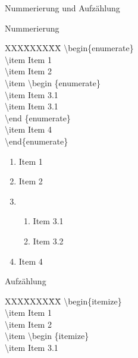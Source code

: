\begin{frame}[fragile]{Nummerierung und Aufz\"ahlung}
\begin{multicols}{2}
Nummerierung
\scriptsize
\begin{tabbing}
XXX\=XXXX\=XX\=\kill
\color{cturkis}\textbackslash begin\{\color{cpurple}enumerate\color{black}\}\\
\>\color{cred}\textbackslash item \color{black}Item 1\\
\>\color{cred}\textbackslash item \color{black}Item 2\\
\>\color{cred}\textbackslash item \color{cturkis}\textbackslash begin \color{black}\{\color{cpurple}enumerate\color{black}\}\\
\>\>\>\color{cred}\textbackslash item \color{black}Item 3.1\\
\>\>\>\color{cred}\textbackslash item \color{black}Item 3.1\\
\>\>\color{cturkis}\textbackslash end \color{black}\{\color{cpurple}enumerate\color{black}\}\\
\>\color{cred}\textbackslash item \color{black}Item 4\\
\color{cturkis}\textbackslash end\{\color{cpurple}enumerate\color{black}\}\\
\end{tabbing}
\normalsize
\begin{enumerate}
    \item Item 1
    \item Item 2
    \item \begin{enumerate}
            \item Item 3.1
            \item Item 3.2
          \end{enumerate}
    \item Item 4
\end{enumerate}
\columnbreak
Aufz\"ahlung
\scriptsize
\begin{tabbing}
XXX\=XXXX\=XX\=\kill
\color{cturkis}\textbackslash begin\{\color{cpurple}itemize\color{black}\}\\
\>\color{cred}\textbackslash item \color{black}Item 1\\
\>\color{cred}\textbackslash item \color{black}Item 2\\
\>\color{cred}\textbackslash item \color{cturkis}\textbackslash begin \color{black}\{\color{cpurple}itemize\color{black}\}\\
\>\>\>\color{cred}\textbackslash item \color{black}Item 3.1\\

\end{tabbing}
\end{multicols}
\end{frame}
